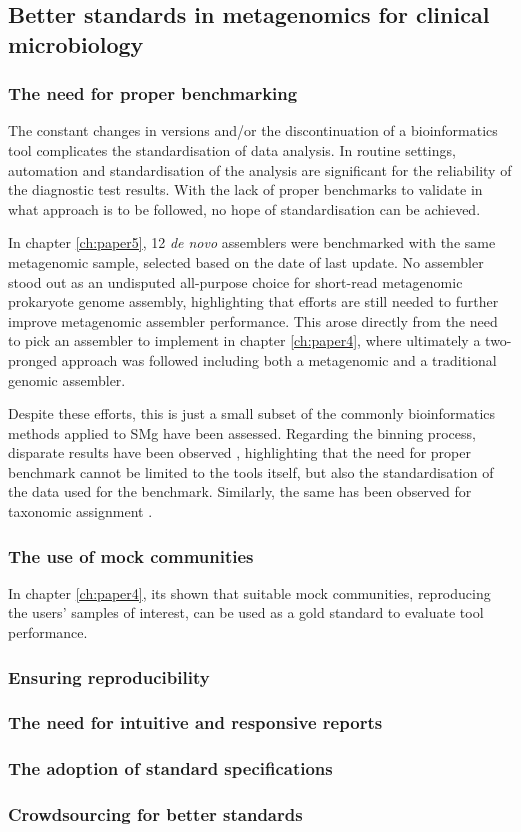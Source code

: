 \subsection{Better standards in metagenomics for clinical microbiology}

\subsubsection{The need for proper benchmarking}

The constant changes in versions and/or the discontinuation of a bioinformatics tool complicates the standardisation of data analysis. In routine settings, automation and standardisation of the analysis are significant for the reliability of the diagnostic test results. With the lack of proper benchmarks to validate in what approach is to be followed, no hope of standardisation can be achieved. 

In chapter \ref{ch:paper5}, 12 \textit{de novo} assemblers were benchmarked with the same metagenomic sample, selected based on the date of last update. No assembler stood out as an undisputed all-purpose choice for short-read metagenomic prokaryote genome assembly, highlighting that efforts are still needed to further improve metagenomic assembler performance. This arose directly from the need to pick an assembler to implement in chapter \ref{ch:paper4}, where ultimately a two-pronged approach was followed including both a metagenomic and a traditional genomic assembler. 

Despite these efforts, this is just a small subset of the commonly bioinformatics methods applied to \ac{SMg} have been assessed. Regarding the binning process, disparate results have been observed \citep{bharti_current_2021, yue_evaluating_2020, yang_review_2021, sczyrba_critical_2017}, highlighting that the need for proper benchmark cannot be limited to the tools itself, but also the standardisation of the data used for the benchmark. Similarly, the same has been observed for taxonomic assignment \citep{sczyrba_critical_2017,ye_benchmarking_2019, tamames_assessing_2019}.

\subsubsection{The use of mock communities}

In chapter \ref{ch:paper4}, its shown that suitable mock communities, reproducing the users’ samples of interest, can be used as a gold standard to evaluate tool performance. 

\subsubsection{Ensuring reproducibility}

\subsubsection{The need for intuitive and responsive reports}

\subsubsection{The adoption of standard specifications}

\subsubsection{Crowdsourcing for better standards}